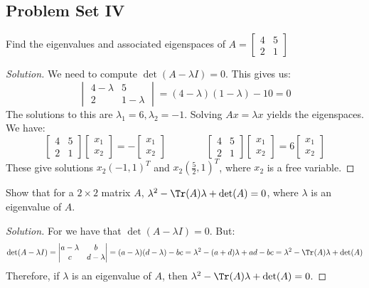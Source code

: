 \documentclass[crop=false,class=book]{standalone}
\begin{document}
\subsection{Problem Set IV}
\begin{problem}
Find the eigenvalues and associated eigenspaces of $A = \begin{bmatrix}4 & 5 \\ 2 & 1 \end{bmatrix}$
\end{problem}
\begin{proof}[Solution]
We need to compute $\det(A-\lambda I)=0$. This gives us:
\begin{equation*}
    \begin{vmatrix} 4-\lambda & 5 \\ 2 & 1-\lambda \end{vmatrix} = (4-\lambda)(1-\lambda)-10 = 0
\end{equation*}
The solutions to this are $\lambda_1 = 6, \lambda_2 = -1$. Solving $Ax = \lambda x$ yields the eigenspaces. We have:
\begin{equation*}
    \begin{bmatrix} 4 & 5 \\ 2 & 1 \end{bmatrix} \begin{bmatrix} x_1 \\ x_2 \end{bmatrix}=-\begin{bmatrix} x_1 \\ x_2 \end{bmatrix}\quad\quad\quad\quad\begin{bmatrix} 4 & 5 \\ 2 & 1 \end{bmatrix} \begin{bmatrix} x_1 \\ x_2 \end{bmatrix}=6\begin{bmatrix} x_1 \\ x_2 \end{bmatrix}
\end{equation*}
These give solutions $x_2(-1,1)^T$ and $x_2 (\frac{5}{2},1)^T$, where $x_2$ is a free variable.
\end{proof}
\begin{problem}
Show that for a $2\times 2$ matrix $A$, $\lambda^2 - \Tr(A)\lambda + \det(A) = 0$, where $\lambda$ is an eigenvalue of $A$.
\end{problem}
\begin{proof}[Solution]
For we have that $\det(A-\lambda I) = 0$. But:
\begin{equation*}
    \det(A-\lambda I)=\begin{vmatrix} a-\lambda & b \\ c & d-\lambda \end{vmatrix}=(a-\lambda)(d-\lambda)-bc=\lambda^2-(a+d)\lambda+ad-bc=\lambda^{2}-\Tr(A)\lambda+\det(A)
\end{equation*}
Therefore, if $\lambda$ is an eigenvalue of $A$, then $\lambda^2 - \Tr(A) \lambda + \det(A) = 0$.
\end{proof}
\end{document}
